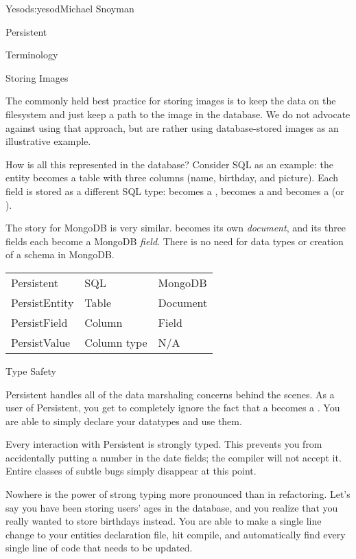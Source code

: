 \begin{aosachapter}{Yesod}{s:yesod}{Michael Snoyman}
\begin{aosasect1}{Persistent}
\begin{aosasect2}{Terminology}
\begin{aosabox}{Storing Images}

The commonly held best practice for storing images is to keep the data
on the filesystem and just keep a path to the image in the
database. We do not advocate against using that approach, but are
rather using database-stored images as an illustrative example.

\end{aosabox}

How is all this represented in the database? Consider SQL as an
example: the  entity becomes a table with three columns
(name, birthday, and picture). Each field is stored as a different SQL
type:  becomes a ,  becomes a
 and  becomes a  (or ).

The story for MongoDB is very similar.  becomes its own
\emph{document}, and its three fields each become a MongoDB
\emph{field}. There is no need for data types or creation of a schema
in MongoDB.

\begin{tabular}{lll}
Persistent & SQL & MongoDB \\
PersistEntity & Table & Document \\
PersistField & Column & Field \\
PersistValue & Column type & N/A \\
\end{tabular}
 
\end{aosasect2}

\begin{aosasect2}{Type Safety}

Persistent handles all of the data marshaling concerns behind the
scenes. As a user of Persistent, you get to completely ignore the fact
that a  becomes a . You are able to simply
declare your datatypes and use them.

Every interaction with Persistent is strongly typed. This prevents you
from accidentally putting a number in the date fields; the compiler
will not accept it. Entire classes of subtle bugs simply disappear at
this point.

Nowhere is the power of strong typing more pronounced than in
refactoring. Let's say you have been storing users' ages in the
database, and you realize that you really wanted to store birthdays
instead. You are able to make a single line change to your entities
declaration file, hit compile, and automatically find every single
line of code that needs to be updated.


\end{aosasect2}
\end{aosasect1}
\end{aosachapter}
